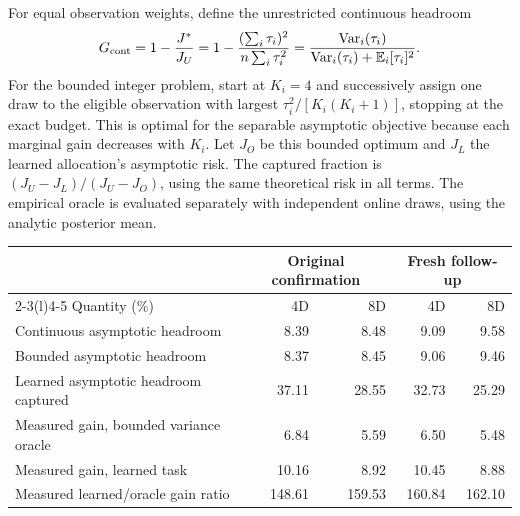 \documentclass[10pt,letterpaper]{article}
\newcommand{\E}{\mathbb E}
\begin{document}
For equal observation weights, define the unrestricted continuous headroom
\begin{equation}
 G_{\rm cont}=1-\frac{J^*}{J_U}=1-\frac{(\sum_i\tau_i)^2}{n\sum_i\tau_i^2}
 =\frac{\operatorname{Var}_i(\tau_i)}{\operatorname{Var}_i(\tau_i)+\E_i[\tau_i]^2}.
\end{equation}
For the bounded integer problem, start at $K_i=4$ and successively assign one draw to the eligible observation with largest $\tau_i^2/[K_i(K_i+1)]$, stopping at the exact budget. This is optimal for the separable asymptotic objective because each marginal gain decreases with $K_i$. Let $J_O$ be this bounded optimum and $J_L$ the learned allocation's asymptotic risk. The captured fraction is $(J_U-J_L)/(J_U-J_O)$, using the same theoretical risk in all terms. The empirical oracle is evaluated separately with independent online draws, using the analytic posterior mean.
\begin{center}\begin{minipage}{\linewidth}\centering\small
\begin{tabular}{@{}lrrrr@{}}
\toprule
&\multicolumn{2}{c}{Original confirmation}&\multicolumn{2}{c}{Fresh follow-up}\\
\cmidrule(lr){2-3}\cmidrule(l){4-5}
Quantity (\%)&4D&8D&4D&8D\\
\midrule
Continuous asymptotic headroom&8.39&8.48&9.09&9.58\\
Bounded asymptotic headroom&8.37&8.45&9.06&9.46\\
Learned asymptotic headroom captured&37.11&28.55&32.73&25.29\\
Measured gain, bounded variance oracle&6.84&5.59&6.50&5.48\\
Measured gain, learned task&10.16&8.92&10.45&8.88\\
Measured learned/oracle gain ratio&148.61&159.53&160.84&162.10\\
\bottomrule
\end{tabular}
\label{tab:oracle}
\end{minipage}\end{center}
\end{document}
